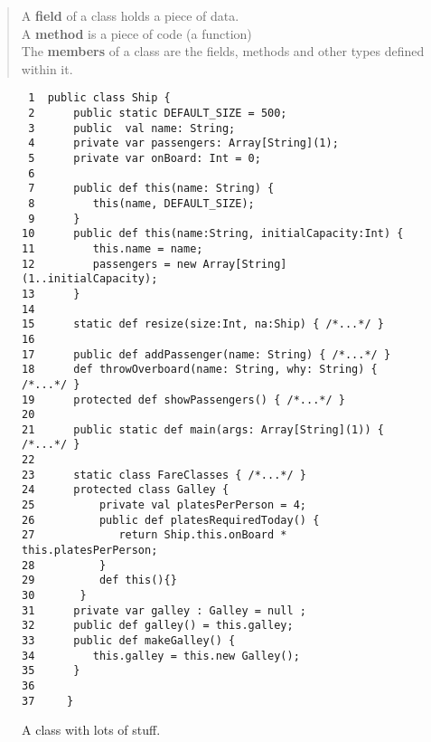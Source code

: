 \begin{quote}
A {\bf field} of a class holds a piece of data.\\
A {\bf method} is a piece of code (a function)\\
The {\bf members} of a class are the fields, methods and other types defined within it. 
\end{quote}
\begin{figure}[!htbp]
\hrulefill

\begin{verbatim}
 1  public class Ship {
 2      public static DEFAULT_SIZE = 500;
 3      public  val name: String;
 4      private var passengers: Array[String](1);
 5      private var onBoard: Int = 0;
 6      
 7      public def this(name: String) {
 8         this(name, DEFAULT_SIZE);
 9      } 
10      public def this(name:String, initialCapacity:Int) {
11         this.name = name;  
12         passengers = new Array[String](1..initialCapacity);
13      }
14  
15      static def resize(size:Int, na:Ship) { /*...*/ }
16  
17      public def addPassenger(name: String) { /*...*/ }
18      def throwOverboard(name: String, why: String) { /*...*/ }
19      protected def showPassengers() { /*...*/ }
20      
21      public static def main(args: Array[String](1)) { /*...*/ } 
22      
23      static class FareClasses { /*...*/ }   
24      protected class Galley { 
25          private val platesPerPerson = 4;
26          public def platesRequiredToday() {
27             return Ship.this.onBoard * this.platesPerPerson;
28          }
29          def this(){}
30       }
31      private var galley : Galley = null ; 
32      public def galley() = this.galley; 
33      public def makeGalley() {
34         this.galley = this.new Galley(); 
35      }
36  
37     }
\end{verbatim}

\hrulefill
\caption{A class with lots of stuff.}\label{fig:nark}
\end{figure}
